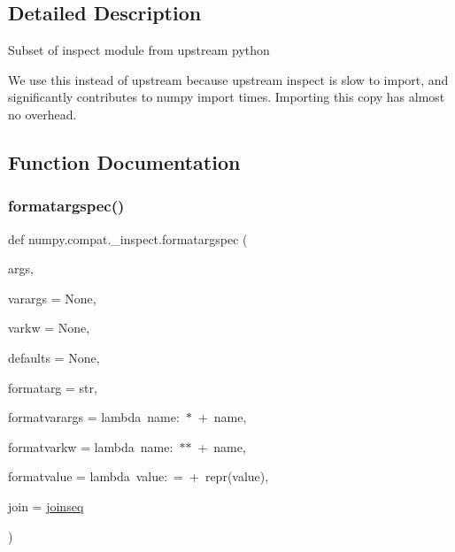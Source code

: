 \subsection{Detailed Description}
\begin{DoxyVerb}Subset of inspect module from upstream python

We use this instead of upstream because upstream inspect is slow to import, and
significantly contributes to numpy import times. Importing this copy has almost
no overhead.\end{DoxyVerb}
 

\subsection{Function Documentation}
\mbox{\label{namespacenumpy_1_1compat_1_1__inspect_a67dec5118cf81371090560691d8f4fc4}} 
\subsubsection{\texorpdfstring{formatargspec()}{formatargspec()}}
{\footnotesize\ttfamily def numpy.\+compat.\+\_\+inspect.\+formatargspec (\begin{DoxyParamCaption}\item[{}]{args,  }\item[{}]{varargs = {\ttfamily None},  }\item[{}]{varkw = {\ttfamily None},  }\item[{}]{defaults = {\ttfamily None},  }\item[{}]{formatarg = {\ttfamily str},  }\item[{}]{formatvarargs = {\ttfamily lambda~name\+:~\textquotesingle{}$\ast$\textquotesingle{}~+~name},  }\item[{}]{formatvarkw = {\ttfamily lambda~name\+:~\textquotesingle{}$\ast$$\ast$\textquotesingle{}~+~name},  }\item[{}]{formatvalue = {\ttfamily lambda~value\+:~\textquotesingle{}=\textquotesingle{}~+~repr(value)},  }\item[{}]{join = {\ttfamily \hyperlink{namespacenumpy_1_1compat_1_1__inspect_ab1438af7fbbffb0fd2b5a564cdd7eef8}{joinseq}} }\end{DoxyParamCaption})}

